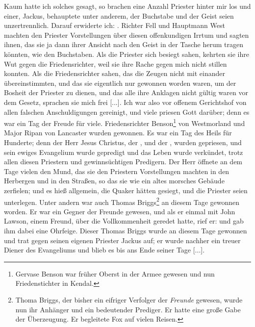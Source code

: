 Kaum
hatte ich solches gesagt, so brachen eine Anzahl Priester hinter
mir los und einer, Jackus, behauptete unter anderem, der
Buchstabe und der Geist seien unzertrennlich. Darauf erwiderte
ich: . Richter Fell und Hauptmann West machten den Priester
Vorstellungen über diesen offenkundigen Irrtum und sagten ihnen,
das sie ja dann ihrer Ansicht nach den Geist in der Tasche herum
tragen könnten, wie den Buchstaben. Als die Priester sich besiegt
sahen, kehrten sie ihre Wut gegen die Friedensrichter, weil sie
ihre Rache gegen mich nicht stillen konnten. Als die 
Friedensrichter sahen, das die Zeugen nicht mit 
einander übereinstimmten,
und das sie eigentlich nur gewonnen worden waren, um der
Bosheit der Priester zu dienen, und das alle ihre Anklagen nicht
gültig waren vor dem Gesetz, sprachen sie mich frei [...]. Ich
war also vor offenem Gerichtshof von allen falschen 
Anschuldigungen gereinigt, und viele priesen Gott darüber; 
denn es war
ein Tag der Freude für viele. Friedensrichter 
Benson\footnote{Gervase Benson war früher Oberst in der 
Armee gewesen und nun
Friedenstichter in Kendal.} von Westmorland und Major Ripan
von Lancaster wurden gewonnen.
Es war ein Tag des Heils für Hunderte; denn der Herr Jesus
Christus, der , und der , wurden gepriesen, und sein 
ewiges Evangelium wurde gepredigt und das Leben wurde verkündet, 
trotz allen diesen Priestern
und gewinnsüchtigen Predigern. Der Herr öffnete an dem Tage
vielen den Mund, das sie den Priestern Vorstellungen machten
in den Herbergen und in den Straßen, so das sie wie ein altes
morsches Gebäude zerfielen; und es hieß allgemein, die Quaker
hätten gesiegt, und die Priester seien unterlegen. Unter andern
war auch Thomas Briggs\footnote{Thoma Briggs, der bisher 
ein eifriger Verfolger der \textit{Freunde} gewesen, 
wurde nun ihr Anhänger und ein bedeutender Prediger. 
Er hatte eine große Gabe der Überzeugung. Er begleitete 
Fox auf vielen Reisen.} an diesem 
Tage gewonnen worden. Er
war ein Gegner der Freunde gewesen, und als er einmal mit
John Lawson, einem Freund, über die Vollkommenheit geredet hatte,
rief er:  und gab ihm dabei
eine Ohrfeige. Dieser Thomas Briggs wurde an diesem Tage
gewonnen und trat gegen seinen eigenen 
Priester Jackus auf; er
wurde nachher ein treuer Diener des Evangeliums und blieb es
bis ans Ende seiner Tage [...].
